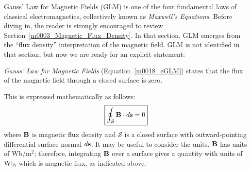 

\label{m0018_Gauss_Law_Magnetic_Integral_Form} %

Gauss' Law for Magnetic Fields (GLM) is one of the four fundamental laws of classical electromagnetics, collectively known as \emph{Maxwell's Equations}.
Before diving in, the reader is strongly encouraged to review Section~\ref{m0003_Magnetic_Flux_Density}.
In that section, GLM emerges from the ``flux density'' interpretation of the magnetic field.  GLM is not identified in that section, but now we are ready for an explicit statement:
%
\begin{mdframed}[backgroundcolor=yellow!20,nobreak=true] 
\emph{Gauss' Law for Magnetic Fields} (Equation~\ref{m0018_eGLM}) states that the flux of the magnetic field through a closed surface is zero.
\end{mdframed}
%
This is expressed mathematically as follows:
%
\begin{equation}
\boxed{
\oint_{\mathcal S} {\bf B}\cdot d{\bf s} = 0
}
\label{m0018_eGLM}
\end{equation}
%
where 
${\bf B}$ is magnetic flux density and
${\mathcal S}$ is a closed surface with outward-pointing differential surface normal $d{\bf s}$.
It may be useful to consider the units.
${\bf B}$ has units of Wb/m$^{2}$; therefore, integrating ${\bf B}$ over a surface gives a quantity with units of Wb, which is magnetic flux, as indicated above.

